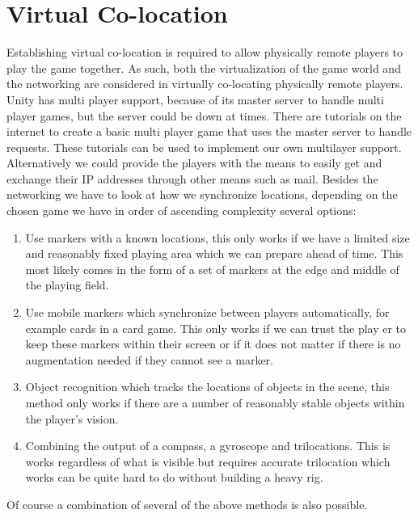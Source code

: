 \section{Virtual Co-location} \label{sec:virtualcolocation}
	Establishing virtual co-location is required to allow physically remote players
	to play the game together. As such, both the virtualization of the game world and
	the networking are considered in virtually co-locating physically remote players.
	Unity has multi player support, because of its master server to handle multi player
	games, but the server could be down at times. There are tutorials on the internet
	to create a basic multi player game that uses the master server to handle requests.
	These tutorials can be used to implement our own multilayer support. Alternatively
	we could provide the players with the means to easily get and exchange their IP
	addresses through other means such as mail.
	Besides the networking we have to look at how we synchronize locations, depending on
	the chosen game we have in order of ascending complexity several options:

	\begin{enumerate}
		\item Use markers with a known locations, this only works if we have a limited size
		      and reasonably fixed playing area which we can prepare ahead of time. This most
					likely comes in the form of a set of markers at the edge and middle of the playing
					field.
		\item Use mobile markers which synchronize between players automatically, for example
		      cards in a card game. This only works if we can trust the play er to keep these markers
					within their screen or if it does not matter if there is no augmentation needed if they
					cannot see a marker.
		\item Object recognition which tracks the locations of objects in the scene,
		      this method only works if there are a number of reasonably stable objects
					within the player's vision.
		\item Combining the output of a compass, a gyroscope and trilocations. This is
		      works regardless of what is visible but requires accurate trilocation which works
					can be quite hard to do without building a heavy rig.
	\end{enumerate}
	Of course a combination of several of the above methods is also possible.

